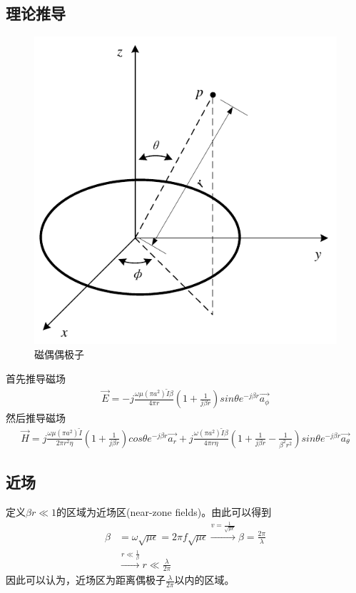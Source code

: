 \documentclass[lang=cn,11pt]{elegantpaper}
\begin{document}
\subsection{理论推导}
\begin{figure}[ht]
  \centering
  \includegraphics[width=0.3\linewidth]{figure//Magnetic_Dipole.pdf}
  \vspace{-0.3cm}
  \caption{磁偶偶极子}\label{fig:Magnetic_Dipole}
\end{figure}
首先推导磁场
\begin{equation}
  \begin{aligned}
    \vec{E} = -j\frac{\omega \mu (\pi a^2)\widetilde{I}\beta}{4\pi r}\left(1+\frac{1}{j\beta r}\right)sin\theta e^{-j\beta r}\vec{a_{\phi}}
\end{aligned}
\end{equation}
然后推导磁场
\begin{equation}
  \begin{aligned}
    \vec{H} = j\frac{\omega \mu (\pi a^2)\widetilde{I}}{2\pi r^2\eta}\left(1+\frac{1}{j\beta r}\right)cos\theta e^{-j\beta r}\vec{a_r} + j\frac{\omega (\pi a^2)\widetilde{I}\beta}{4\pi r \eta}\left(1+\frac{1}{j\beta r} - \frac{1}{{\beta}^2 r^2}\right)sin\theta e^{-j\beta r}\vec{a_{\theta}}
\end{aligned}
\end{equation}

\subsection{近场}
定义$\beta r \ll 1$的区域为近场区(near-zone fields)。由此可以得到
\begin{equation}
  \begin{aligned}
    \beta &= \omega\sqrt{\mu \epsilon} = 2\pi f \sqrt{\mu \epsilon} \xrightarrow{v = \frac{1}{\sqrt{\mu \epsilon}}} \beta = \frac{2\pi}{\lambda} \\
    &\xrightarrow{r\ll \frac{1}{\beta}} r\ll \frac{\lambda}{2\pi}
  \end{aligned}
\end{equation}
因此可以认为，近场区为距离偶极子$\frac{\lambda}{2\pi}$以内的区域。

\nocite{*}


\end{document}
